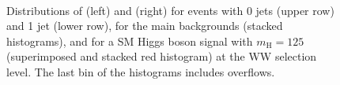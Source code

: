 \begin{figure}
\centering
{}
\\
\caption{Distributions of \MET (left) and \ptll (right) for events with 0 jets (upper row) and 1 jet (lower row), for the main backgrounds (stacked histograms), and for a SM Higgs boson signal with $m_\mathrm{H}=125$\GeV (superimposed and stacked red histogram) at the WW selection level. The last bin of the histograms includes overflows.}\label{fig:distr3}
\end{figure}

